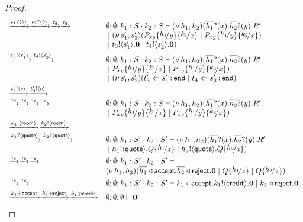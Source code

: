 \begin{proof}
\[\begin{array}{ll}
		\by{\bactinp{t_1}{b}} \by{\bactinp{t_2}{b}} \by{\dtau}\by{\dtau}&
		\es; \es; k_1: S \cat k_2: S \proves \newsp{h_1, h_2}{
		\binp{\dual{h_1}}{x} \binp{\dual{h_2}}{y} R' \\
		&  \Par \newsp{s_1', s_2'}{ P_{xy}\subst{h_1}{y} \subst{k_1}{x} \Par P_{xy}\subst{h_1}{y} \subst{k_2}{x}}\\
		& \Par \bout{t_3}{s_1'} \inact \Par \bout{t_4}{s_2'} \inact}
		\\[1mm]

		\by{\bactout{t_3}{s_1'}} \by{ \bactout{t_4}{s_2'}} &
		\es; \es; k_1: S \cat k_2: S \proves \newsp{h_1, h_2}{
		\binp{\dual{h_1}}{x} \binp{\dual{h_2}}{y} R' \\
		&  \Par P_{xy}\subst{h_1}{y} \subst{k_1}{x} \Par P_{xy}\subst{h_1}{y} \subst{k_2}{x}}\\
		& \Par \newsp{s_1', s_2'}{\ftrigger{t_3'}{s_1'}{\tinact} \Par \ftrigger{t_4}{s_2'}{\tinact}}
		\\[1mm]

		\by{\bactout{t_3'}{c}} \by{ \bactout{t_4'}{c}} \\
		\by{\dtau} \by{\dtau} \by{\dtau} \by{\dtau} &
		\es; \es; k_1: S \cat k_2: S \proves \newsp{h_1, h_2}{
		\binp{\dual{h_1}}{x} \binp{\dual{h_2}}{y} R' \\
		&  \Par P_{xy}\subst{h_1}{y} \subst{k_1}{x} \Par P_{xy}\subst{h_1}{y} \subst{k_2}{x}}
		\\[1mm]

		\by{\bactout{k_1}{\rtype}} \by{\bactout{k_2}{\rtype}}\\
		\by{\bactinp{k_1}{\Quote}} \by{\bactinp{k_2}{\Quote}}
		& \es; \es; k_1: S' \cat k_2: S' \proves \newsp{h_1, h_2}{
		\binp{\dual{h_1}}{x} \binp{\dual{h_2}}{y} R'\\
		& \Par \bout{h_1}{\Quote} Q \subst{h_1}{z} \Par \bout{h_2}{\Quote} Q \subst{h_2}{z}}
		\\[1mm]

		\by{\dtau} \by{\dtau} \by{\dtau}&
		\es; \es; k_1: S' \cat k_2: S' \proves \\
		& \newsp{h_1, h_2}{\bsel{\dual{h_1}}{\accept} \bsel{\dual{h_2}}{\reject} \inact
		\Par Q \subst{h_1}{z} \Par Q \subst{h_2}{z}}
		\\[1mm]

		\by{\dtau} \by{\dtau}&
		\es; \es; k_1: S' \cat k_2: S' \proves
		\bsel{k_1}{\accept} \bout{k_1}{\creditc} \inact 
		\Par \bsel{k_2}{\reject} \inact
		\\[1mm]

		\by{\bactsel{k_1}{\accept}} \by{\bactsel{k_2}{\reject}} \by{\bactsel{k_1}{\creditc}}&
		\es; \es; \es \proves \inact
	\end{array}
\]


\end{proof}
